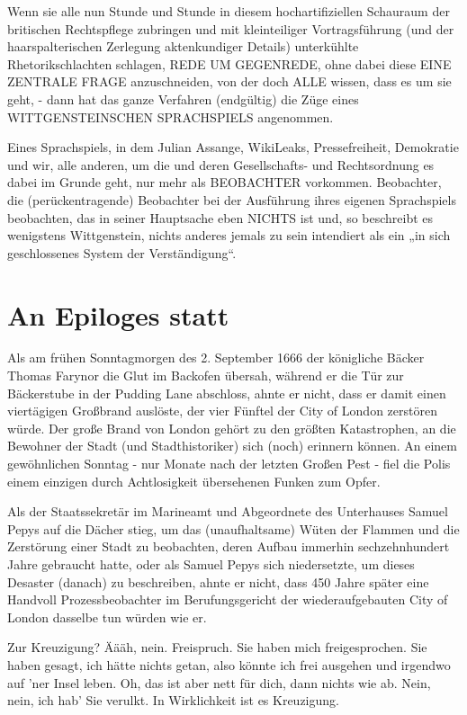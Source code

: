 \begin{multicols}{2}
Wenn sie alle nun Stunde und Stunde in diesem hochartifiziellen Schauraum der britischen Rechtspflege zubringen und mit kleinteiliger Vortragsführung (und der
haarspalterischen Zerlegung aktenkundiger Details)
unterkühlte Rhetorikschlachten schlagen, REDE UM
GEGENREDE, ohne dabei diese EINE ZENTRALE FRAGE anzuschneiden, von der doch ALLE wissen, dass es
um sie geht, - dann hat das ganze Verfahren (endgültig)
die Züge eines WITTGENSTEINSCHEN SPRACHSPIELS
angenommen.

Eines Sprachspiels, in dem Julian Assange, WikiLeaks,
Pressefreiheit, Demokratie und wir, alle anderen, um die
und deren Gesellschafts- und Rechtsordnung es dabei
im Grunde geht, nur mehr als BEOBACHTER vorkommen. Beobachter, die (perückentragende) Beobachter
bei der Ausführung ihres eigenen Sprachspiels beobachten, das in seiner Hauptsache eben NICHTS ist und, so
beschreibt es wenigstens Wittgenstein, nichts anderes
jemals zu sein intendiert als ein „in sich geschlossenes
System der Verständigung“.



\chapter{An Epiloges statt} %
Als am frühen Sonntagmorgen des 2. September 1666
der königliche Bäcker Thomas Farynor die Glut im Backofen übersah, während er die Tür zur Bäckerstube in der
Pudding Lane abschloss, ahnte er nicht, dass er damit
einen viertägigen Großbrand auslöste, der vier Fünftel
der City of London zerstören würde. Der große Brand
von London gehört zu den größten Katastrophen, an die
Bewohner der Stadt (und Stadthistoriker) sich (noch) erinnern können. An einem gewöhnlichen Sonntag - nur
Monate nach der letzten Großen Pest - fiel die Polis einem einzigen durch Achtlosigkeit übersehenen Funken
zum Opfer.

Als der Staatssekretär im Marineamt und Abgeordnete
des Unterhauses Samuel Pepys auf die Dächer stieg, um
das (unaufhaltsame) Wüten der Flammen und die Zerstörung einer Stadt zu beobachten, deren Aufbau immerhin sechzehnhundert Jahre gebraucht hatte, oder
als Samuel Pepys sich niedersetzte, um dieses Desaster
(danach) zu beschreiben, ahnte er nicht, dass 450 Jahre
später eine Handvoll Prozessbeobachter im Berufungsgericht der wiederaufgebauten City of London dasselbe
tun würden wie er.

Zur Kreuzigung? Äääh, nein. Freispruch. Sie haben mich
freigesprochen. Sie haben gesagt, ich hätte nichts getan,
also könnte ich frei ausgehen und irgendwo auf ’ner Insel leben. Oh, das ist aber nett für dich, dann nichts wie
ab. Nein, nein, ich hab’ Sie verulkt. In Wirklichkeit ist es
Kreuzigung.


\end{multicols}
